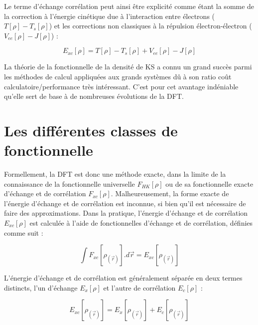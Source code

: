 Le terme d'échange corrélation peut ainsi être explicité comme étant la somme de la correction à l'énergie cinétique due à l'interaction entre électrons ($T[\rho] - T_{s}[\rho]$) et les corrections non classiques à la répulsion électron-électron ($V_{ee}[\rho] - J[\rho]$) :

\begin{equation}
E_{xc}[\rho] = T[\rho] - T_{s}[\rho] + V_{ee}[\rho] - J[\rho]
\end{equation}

La théorie de la fonctionnelle de la densité de KS a connu un grand succès parmi les méthodes de calcul appliquées aux grands systèmes dû à son ratio coût calculatoire/performance très intéressant. C'est pour cet avantage indéniable qu'elle sert de base à de nombreuses évolutions de la DFT.

\section{Les différentes classes de fonctionnelle}

Formellement, la DFT est donc une méthode exacte, dans la limite de la connaissance de la fonctionnelle universelle $F_{HK}[\rho]$ ou de sa fonctionnelle exacte d’échange et de corrélation $F_{xc}[\rho]$. Malheureusement, la forme exacte de l’énergie d’échange et de corrélation est inconnue, si bien qu’il est nécessaire de faire des approximations. Dans la pratique, l’énergie d’échange et de corrélation $E_{xc}[\rho]$ est calculée à l’aide de fonctionnelles d’échange et de corrélation, définies comme suit :

\begin{equation}
\int F_{xc}[\rho_{(\vec{r})}].d\vec{r} = E_{xc}[\rho_{(\vec{r})}]
\end{equation}

L’énergie d’échange et de corrélation est généralement séparée en deux termes distincts, l’un d’échange $E_{x}[\rho]$ et l’autre de corrélation $E_{c}[\rho]$ :

\begin{equation}
E_{xc}[\rho_{(\vec{r})}] = E_{x}[\rho_{(\vec{r})}] + E_{c}[\rho_{(\vec{r})}]
\end{equation}

